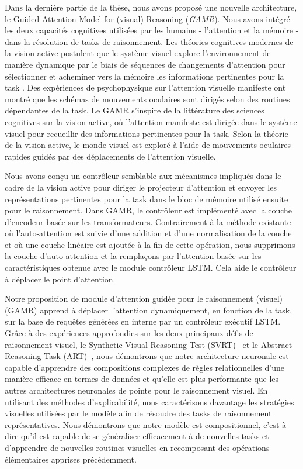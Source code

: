 Dans la derni\`ere partie de la th\`ese, nous avons propos\'e une nouvelle architecture, le Guided Attention Model for (visual) Reasoning (\textit{GAMR}). Nous avons int\'egr\'e les deux capacit\'es cognitives utilis\'ees par les humains - l'attention et la m\'emoire - dans la r\'esolution de tasks de raisonnement. Les th\'eories cognitives modernes de la vision active postulent que le syst\`eme visuel explore l'environnement de mani\`ere dynamique par le biais de s\'equences de changements d'attention pour s\'electionner et acheminer vers la m\'emoire les informations pertinentes pour la task \citep{ullman1984massachusetts,ullman1987visual}. Des exp\'eriences de psychophysique \citep{hayhoe2000vision} sur l'attention visuelle manifeste ont montr\'e que les sch\'emas de mouvements oculaires sont dirig\'es selon des routines d\'ependantes de la task. Le GAMR s'inspire de la litt\'erature des sciences cognitives sur la vision active, où l'attention manifeste est dirig\'ee dans le syst\`eme visuel pour recueillir des informations pertinentes pour la task. Selon la th\'eorie de la vision active, le monde visuel est explor\'e \`a l'aide de mouvements oculaires rapides guid\'es par des d\'eplacements de l'attention visuelle. 


\color{black}
Nous avons conçu un contrôleur semblable aux m\'ecanismes impliqu\'es dans le cadre de la vision active pour diriger le projecteur d'attention et envoyer les repr\'esentations pertinentes pour la task dans le bloc de m\'emoire utilis\'e ensuite pour le raisonnement. Dans GAMR, le contrôleur est impl\'ement\'e avec la couche d'encodeur bas\'ee sur les transformateurs. Contrairement \`a la m\'ethode existante où l'auto-attention est suivie d'une addition et d'une normalisation de la couche et où une couche lin\'eaire est ajout\'ee \`a la fin de cette op\'eration, nous supprimons la couche d'auto-attention et la remplaçons par l'attention bas\'ee sur les caract\'eristiques obtenue avec le module contrôleur LSTM. Cela aide le contrôleur \`a d\'eplacer le point d'attention. 
 
Notre proposition de module d'attention guid\'ee pour le raisonnement (visuel) (GAMR) apprend \`a d\'eplacer l'attention dynamiquement, en fonction de la task, sur la base de requ\^etes g\'en\'er\'ees en interne par un contrôleur ex\'ecutif LSTM. Grâce \`a des exp\'eriences approfondies sur les deux principaux d\'efis de raisonnement visuel, le Synthetic Visual Reasoning Test (SVRT)~\citep{fleuret2011comparing} et le Abstract Reasoning Task (ART)~\citep{Webb2021EmergentST}, nous d\'emontrons que notre architecture neuronale est capable d'apprendre des compositions complexes de r\`egles relationnelles d'une mani\`ere efficace en termes de donn\'ees et qu'elle est plus performante que les autres architectures neuronales de pointe pour le raisonnement visuel. En utilisant des m\'ethodes d'explicabilit\'e, nous caract\'erisons davantage les strat\'egies visuelles utilis\'ees par le mod\`ele afin de r\'esoudre des tasks de raisonnement repr\'esentatives. Nous d\'emontrons que notre mod\`ele est compositionnel, c'est-\`a-dire qu'il est capable de se g\'en\'eraliser efficacement \`a de nouvelles tasks et d'apprendre de nouvelles routines visuelles en recomposant des op\'erations \'el\'ementaires apprises pr\'ec\'edemment. 

